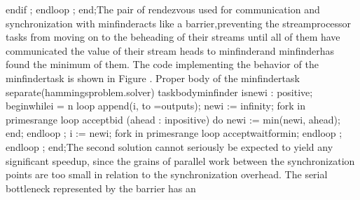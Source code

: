       \tyxtstxbf[]end\tyxtstxendbf[] \tyxtstxbf[]if%
\tyxtstxendbf[];
   \tyxtstxbf[]end\tyxtstxendbf[] \tyxtstxbf[]loop%
\tyxtstxendbf[];
\tyxtstxbf[]end\tyxtstxendbf[];\Endcomp[]
\EndParbox[]
\FgEndblock[]
\Endpara[]
\Para[]The pair of rendezvous used for communication and synchronization
with \tyxffmxmono[]min\Symuns[]finder\tyxffmxendmono[] acts like a
\ldquo[]barrier,\rdquo[] preventing the \tyxffmxmono[]stream\Symuns[]processor%
\tyxffmxendmono[] tasks from moving on to the beheading of their streams
until all of them have communicated the value of their stream heads
to \tyxffmxmono[]min\Symuns[]finder\tyxffmxendmono[] and %
\tyxffmxmono[]min\Symuns[]finder\tyxffmxendmono[] has found the minimum
of them. The code implementing the behavior of the %
\tyxffmxmono[]min\Symuns[]finder\tyxffmxendmono[] task is shown in
Figure .
\Parbox[]
Proper body of the %
\tyxffmxmono[]min\Symuns[]finder\tyxffmxendmono[] task%
\FgEndcap[]
\Comp[]\tyxtstxbf[]separate\tyxtstxendbf[] (hammings\Symuns[]problem.solver)
\tyxtstxbf[]task\tyxtstxendbf[] \tyxtstxbf[]body\tyxtstxendbf[] min\Symuns[]finder %
\tyxtstxbf[]is\tyxtstxendbf[]
   new\Symuns[]i : positive;
\tyxtstxbf[]begin\tyxtstxendbf[]
   \tyxtstxbf[]while\tyxtstxendbf[] i \Symlt[]= n \tyxtstxbf[]loop%
\tyxtstxendbf[]
      append(i, to =\Symgt[] outputs);
      new\Symuns[]i := infinity;
      \tyxtstxbf[]for\tyxtstxendbf[] k \tyxtstxbf[]in%
\tyxtstxendbf[] primes\rsquo[]range \tyxtstxbf[]loop%
\tyxtstxendbf[]
         \tyxtstxbf[]accept\tyxtstxendbf[] bid (a\Symuns[]head : %
\tyxtstxbf[]in\tyxtstxendbf[] positive) \tyxtstxbf[]do%
\tyxtstxendbf[]
            new\Symuns[]i := min(new\Symuns[]i, a\Symuns[]head);
         \tyxtstxbf[]end\tyxtstxendbf[];
      \tyxtstxbf[]end\tyxtstxendbf[] \tyxtstxbf[]loop%
\tyxtstxendbf[];
      i := new\Symuns[]i;
      \tyxtstxbf[]for\tyxtstxendbf[] k \tyxtstxbf[]in%
\tyxtstxendbf[] primes\rsquo[]range \tyxtstxbf[]loop%
\tyxtstxendbf[]
         \tyxtstxbf[]accept\tyxtstxendbf[] wait\Symuns[]for\Symuns[]min;
      \tyxtstxbf[]end\tyxtstxendbf[] \tyxtstxbf[]loop%
\tyxtstxendbf[];
   \tyxtstxbf[]end\tyxtstxendbf[] \tyxtstxbf[]loop%
\tyxtstxendbf[];
\tyxtstxbf[]end\tyxtstxendbf[];\Endcomp[]
\EndParbox[]
\FgEndblock[]
\Endpara[]
\Para[]The second solution cannot seriously be expected to yield any
significant speedup, since the grains of parallel work between the
synchronization points are too small in relation to the synchronization
overhead. The serial bottleneck represented by the barrier has an
